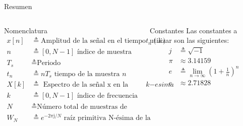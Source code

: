 \documentclass[aspectratio=169]{beamer}
\newcommand{\imag}{\mathrm{j}}
\begin{document}
\begin{frame}{Resumen}

\begin{columns}[c]


\begin{alertblock}{Nomenclatura}
$$
\begin{aligned}
x[n] &\triangleq \text{Amplitud de la señal en el tiempo } t_n (s)\\
n &\triangleq [0,N-1] \text{ índice de muestra} \\
T_s &\triangleq \text{Periodo}  \\ 
t_n &\triangleq nT_s \text{ tiempo de la muestra } n \\ 
X[k] &\triangleq \text{ Espectro de la señal x en la frecuencia radial } k{-esima} \\
k &\triangleq  [0,N-1] \text{ índice de frecuencia }\\
N &\triangleq \text{Número total de muestras de tiempo y frecuencia}\\
W_N &\triangleq e^{-2\pi \imag / N} \text{ raíz primitiva N-ésima de la unidad}
\end{aligned}
$$
\end{alertblock}

\begin{block}{Constantes}
    Las constantes a utilizar son las siguientes:
    $$
\begin{aligned}
    j &\triangleq \sqrt{-1} \\
    \pi  &\approx 3.14159\\
    e &\triangleq \lim_{n \to \infty} \left(1 + \frac{1}{n}\right)^n \\
    e &\approx 2.71828
\end{aligned}    
$$
\end{block}
\end{columns}
\end{frame}
\end{document}
